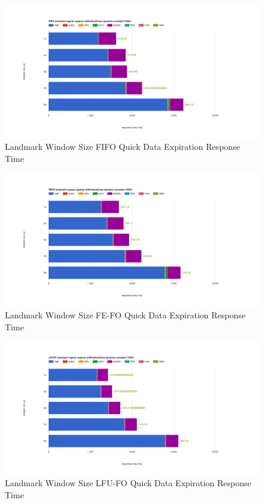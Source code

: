 \begin{figure}[!htbp]
	\centering
    \includegraphics[width=\textwidth]{img/app3-land-ws-fifo-quick-r.png}
    \caption{Landmark Window Size FIFO Quick Data Expiration Response Time}
\end{figure}
\begin{figure}[!htbp]
	\centering
    \includegraphics[width=\textwidth]{img/app3-land-ws-fefo-quick-r.png}
    \caption{Landmark Window Size FE-FO Quick Data Expiration Response Time}
\end{figure}
\begin{figure}[!htbp]
	\centering
    \includegraphics[width=\textwidth]{img/app3-land-ws-lfufo-quick-r.png}
    \caption{Landmark Window Size LFU-FO Quick Data Expiration Response Time}
\end{figure}
